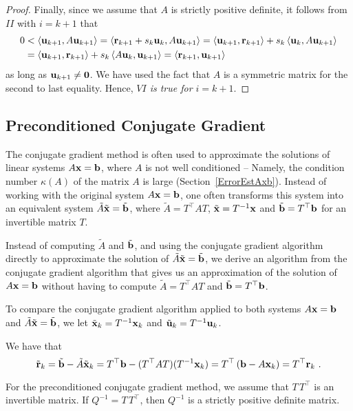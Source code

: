 \begin{proof}
Finally, since we assume that $A$ is strictly positive definite, it follows
from $II$ with $i=k+1$ that
\begin{align*}
0 &< \left\langle{\mathbf{u}_{k+1}} , {A\mathbf{u}_{k+1}}\right\rangle
= \left\langle{\mathbf{r}_{k+1} + s_k \mathbf{u}_k} , {A\mathbf{u}_{k+1}}\right\rangle
= \left\langle{\mathbf{u}_{k+1}} , {\mathbf{r}_{k+1}}\right\rangle + s_k \left\langle{\mathbf{u}_k} , {A\mathbf{u}_{k+1}}\right\rangle \\
&= \left\langle{\mathbf{u}_{k+1}} , {\mathbf{r}_{k+1}}\right\rangle + s_k \left\langle{A\mathbf{u}_k} , {\mathbf{u}_{k+1}}\right\rangle
= \left\langle{\mathbf{r}_{k+1}} , {\mathbf{u}_{k+1}}\right\rangle
\end{align*}
as long as $\mathbf{u}_{k+1} \neq \mathbf{0}$.  We have used the fact that $A$
is a symmetric matrix for the second to last equality.
Hence, {\em $VI$ is true for $i=k+1$}. 
\end{proof}

\subsection{Preconditioned Conjugate Gradient}

The conjugate gradient method is often used to approximate the
solutions of linear systems $A\mathbf{x} = \mathbf{b}$, where $A$ is not well
conditioned -- Namely, the condition number $\kappa(A)$ of the matrix
$A$ is large (Section~\ref{ErrorEstAxb}).  Instead of working with
the original system $A\mathbf{x} = \mathbf{b}$, one often transforms this
system into an equivalent system $\tilde{A} \tilde{\mathbf{x}} = \tilde{\mathbf{b}}$,
where $\tilde{A} = T^\top A T$, $\tilde{\mathbf{x}} = T^{-1}\mathbf{x}$ and
$\tilde{\mathbf{b}} = T^\top \mathbf{b}$ for an invertible matrix $T$.

Instead of computing $\tilde{A}$ and $\tilde{\mathbf{b}}$, and using the
conjugate gradient algorithm directly to approximate the solution of
$\tilde{A} \tilde{\mathbf{x}} = \tilde{\mathbf{b}}$, we derive an algorithm from
the conjugate gradient algorithm that gives us an approximation of the
solution of $A\mathbf{x} =  \mathbf{b}$ without having to compute
$\tilde{A} =T^\top A T$ and $\tilde{\mathbf{b}} = T^{\top}\mathbf{b}$.

To compare the conjugate gradient algorithm applied to both systems
$A\mathbf{x} = \mathbf{b}$ and $\tilde{A} \tilde{\mathbf{x}} = \tilde{\mathbf{b}}$, we let
$\tilde{\mathbf{x}}_k = T^{-1}\mathbf{x}_k$ and $\tilde{\mathbf{u}}_k = T^{-1}\mathbf{u}_k$.

We have that
\[
\tildev{r}_k = \tildev{b} - \tilde{A} \tildev{x}_k
= T^\top \VEC{b} - (T^\top A T)(T^{-1} \VEC{x}_k)
= T^\top \left( \VEC{b} - A \VEC{x}_k\right) = T^\top \VEC{r}_k \ .
\]

For the preconditioned conjugate gradient method, we assume that
$T\,T^\top$ is an invertible matrix.  If $Q^{-1} = T\,T^\top$, then
$Q^{-1}$ is a strictly positive definite matrix.

